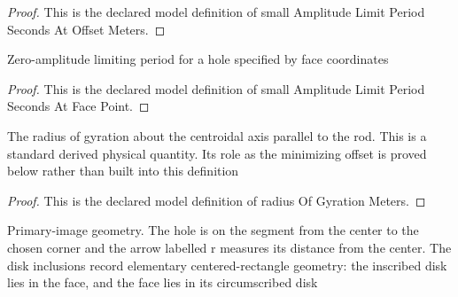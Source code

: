 \begin{proof}
  This is the declared model definition of small Amplitude Limit Period Seconds At Offset Meters.
\end{proof}
\begin{definition}
  \label{def:physics:phyx-mini-0265:phyxminiproblems-problemphyxmini0265-smallamplitudelimitperiodsecondsatfacepoint}
  Zero-amplitude limiting period for a hole specified by face coordinates
\end{definition}
\begin{proof}
  This is the declared model definition of small Amplitude Limit Period Seconds At Face Point.
\end{proof}
\begin{definition}
  \label{def:physics:phyx-mini-0265:phyxminiproblems-problemphyxmini0265-radiusofgyrationmeters}
  The radius of gyration about the centroidal axis parallel to the rod. This is a standard derived physical quantity. Its role as the minimizing offset is proved below rather than built into this definition
\end{definition}
\begin{proof}
  This is the declared model definition of radius Of Gyration Meters.
\end{proof}
\begin{definition}
  \label{def:physics:phyx-mini-0265:phyxminiproblems-problemphyxmini0265-matchesprimaryfigure}
  Primary-image geometry. The hole is on the segment from the center to the chosen corner and the arrow labelled r measures its distance from the center. The disk inclusions record elementary centered-rectangle geometry: the inscribed disk lies in the face, and the face lies in its circumscribed disk
\end{definition}
